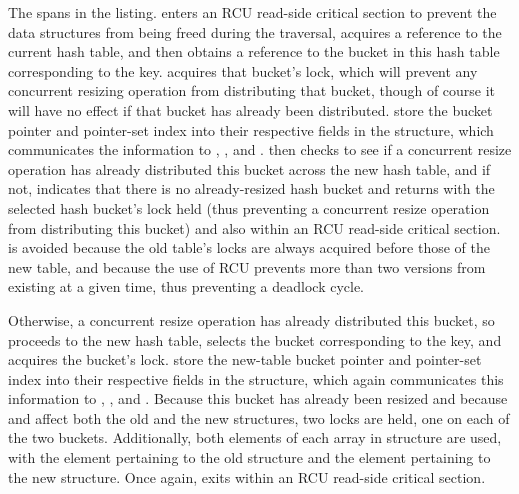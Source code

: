 \begin{fcvref}
The  spans
 in the listing.
 enters an RCU read-side critical section to prevent
the data structures from being freed during the traversal,
 acquires a reference to the current hash table, and then
 obtains a reference to the bucket in this hash table
corresponding to the key.
 acquires that bucket's lock, which will prevent any concurrent
resizing operation from distributing that bucket, though of course it
will have no effect if that bucket has already been distributed.
 store the bucket pointer and
pointer-set index into their respective fields in the
 structure, which communicates the information to
, , and .
 then checks to see if a concurrent resize
operation has already distributed this bucket across the new hash table,
and if not,  indicates that there is no
already-resized hash bucket and
 returns with the selected hash bucket's
lock held (thus preventing a concurrent resize operation from distributing
this bucket) and also within an RCU read-side critical section.
 is avoided because the old table's locks are always acquired
before those of the new table, and because the use of RCU prevents more
than two versions from existing at a given time, thus preventing a
deadlock cycle.

Otherwise, a concurrent resize operation has already distributed this
bucket, so  proceeds to the new hash table,
 selects the bucket corresponding to the key,
and  acquires the bucket's lock.
 store the new-table bucket pointer and
pointer-set index into their respective fields in the
 structure, which again communicates this information to
, , and .
Because this bucket has already been resized and because
 and  affect both the old and the
new  structures, two locks are held, one on each of the
two buckets.
Additionally, both elements of each array in  structure
are used, with the \co{[0]} element pertaining to the old 
structure and the \co{[1]} element pertaining to the new structure.
Once again,  exits within an RCU read-side critical
section.
\end{fcvref}

